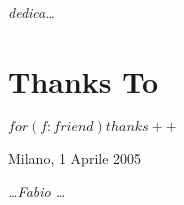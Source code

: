 \begin{flushright}
\Large\textit{dedica\dots}
\end{flushright}


\cleardoublepage

\thispagestyle{empty}

\chapter*{Thanks To}
$
for(f:friend){
thanks++
}
$
\begin{flushleft}
Milano, 1 Aprile 2005
\end{flushleft}

\begin{flushright}
\emph{\dots Fabio \dots}
\end{flushright}

\cleardoublepage
\thispagestyle{empty}